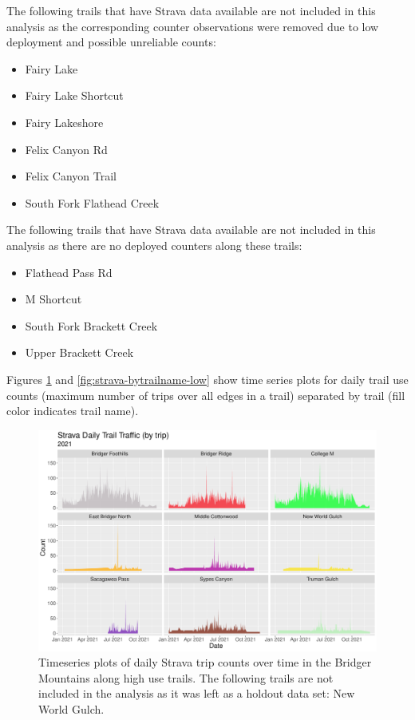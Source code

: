 \documentclass[
]{book}
\begin{document}
The following trails that have Strava data available are not included in
this analysis as the corresponding counter observations were removed due
to low deployment and possible unreliable counts:

\begin{itemize}
\item
  Fairy Lake
\item
  Fairy Lake Shortcut
\item
  Fairy Lakeshore
\item
  Felix Canyon Rd
\item
  Felix Canyon Trail
\item
  South Fork Flathead Creek
\end{itemize}

The following trails that have Strava data available are not included in
this analysis as there are no deployed counters along these trails:

\begin{itemize}
\item
  Flathead Pass Rd
\item
  M Shortcut
\item
  South Fork Brackett Creek
\item
  Upper Brackett Creek
\end{itemize}

Figures \ref{fig:strava-bytrailname-high} and
\ref{fig:strava-bytrailname-low} show time series plots for daily trail
use counts (maximum number of trips over all edges in a trail) separated
by trail (fill color indicates trail name).

\begin{figure}

{\centering \includegraphics[width=1\linewidth]{../figures/Strava_day_TS_bytrip_high} 

}

\caption{Timeseries plots of daily Strava trip counts over time in the Bridger Mountains along high use trails. The following trails are not included in the analysis as it was left as a holdout data set: New World Gulch.}\label{fig:strava-bytrailname-high}
\end{figure}
\end{document}
